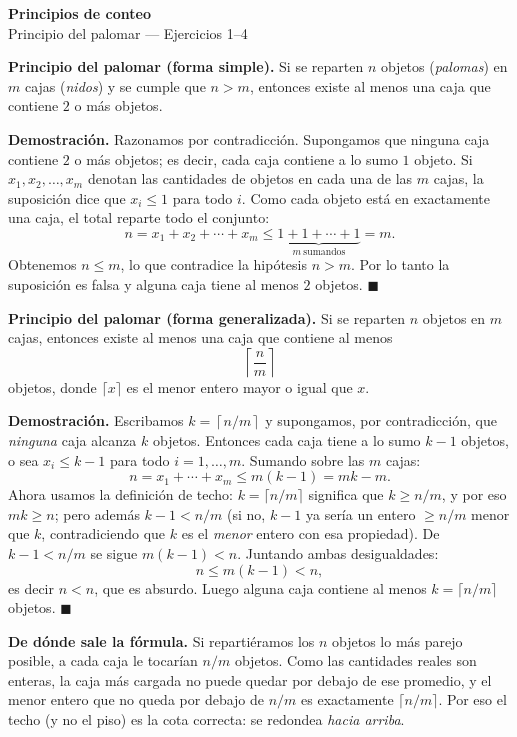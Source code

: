 \documentclass[11pt]{article}
\begin{document}
\begin{center}{\LARGE\bfseries Principios de conteo}\\[2pt]{\large Principio del palomar --- Ejercicios 1--4}\end{center}

\vspace{4pt}

\begin{teo}
\textbf{Principio del palomar (forma simple).} Si se reparten $n$ objetos (\emph{palomas}) en $m$ cajas (\emph{nidos}) y se cumple que $n>m$, entonces existe al menos una caja que contiene $2$ o más objetos.

\smallskip
\textbf{Demostración.} Razonamos por contradicción. Supongamos que ninguna caja contiene $2$ o más objetos; es decir, cada caja contiene a lo sumo $1$ objeto. Si $x_1,x_2,\dots,x_m$ denotan las cantidades de objetos en cada una de las $m$ cajas, la suposición dice que $x_i\le 1$ para todo $i$. Como cada objeto está en exactamente una caja, el total reparte todo el conjunto:
\[
n=x_1+x_2+\cdots+x_m\le \underbrace{1+1+\cdots+1}_{m\ \text{sumandos}}=m .
\]
Obtenemos $n\le m$, lo que contradice la hipótesis $n>m$. Por lo tanto la suposición es falsa y alguna caja tiene al menos $2$ objetos. $\blacksquare$

\smallskip
\textbf{Principio del palomar (forma generalizada).} Si se reparten $n$ objetos en $m$ cajas, entonces existe al menos una caja que contiene al menos
\[
\left\lceil \frac{n}{m} \right\rceil
\]
objetos, donde $\lceil x \rceil$ es el menor entero mayor o igual que $x$.

\smallskip
\textbf{Demostración.} Escribamos $k=\left\lceil n/m \right\rceil$ y supongamos, por contradicción, que \emph{ninguna} caja alcanza $k$ objetos. Entonces cada caja tiene a lo sumo $k-1$ objetos, o sea $x_i\le k-1$ para todo $i=1,\dots,m$. Sumando sobre las $m$ cajas:
\[
n=x_1+\cdots+x_m\le m(k-1)=mk-m .
\]
Ahora usamos la definición de techo: $k=\lceil n/m\rceil$ significa que $k\ge n/m$, y por eso $mk\ge n$; pero además $k-1<n/m$ (si no, $k-1$ ya sería un entero $\ge n/m$ menor que $k$, contradiciendo que $k$ es el \emph{menor} entero con esa propiedad). De $k-1<n/m$ se sigue $m(k-1)<n$. Juntando ambas desigualdades:
\[
n\le m(k-1)<n,
\]
es decir $n<n$, que es absurdo. Luego alguna caja contiene al menos $k=\lceil n/m\rceil$ objetos. $\blacksquare$

\smallskip
\textbf{De dónde sale la fórmula.} Si repartiéramos los $n$ objetos lo más parejo posible, a cada caja le tocarían $n/m$ objetos. Como las cantidades reales son enteras, la caja más cargada no puede quedar por debajo de ese promedio, y el menor entero que no queda por debajo de $n/m$ es exactamente $\lceil n/m\rceil$. Por eso el techo (y no el piso) es la cota correcta: se redondea \emph{hacia arriba}.


\end{teo}
\end{document}
